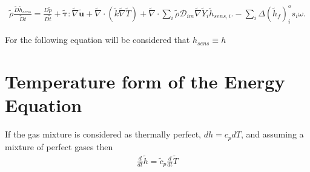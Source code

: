 \documentclass[preprint,12pt,authoryear]{elsarticle}
\begin{document}
\begin{equation}
\begin{split}
	\tilde{\rho}
	\frac{\tilde{D}\tilde{h}_{sens}}{\tilde{D}t}
=
        \frac{D \tilde{p}}{D\tilde{t}}
+       
        \pmb{\tilde{\tau}}:\tilde{\nabla} \tilde{\mathbf{u}} 
+ 
        \tilde{\nabla} \cdot (\tilde{k}\tilde{\nabla} \tilde{T})
+
        \tilde{\nabla} \cdot
        \sum\limits_i 
        \tilde{\rho}\mathcal{D}_{im}\tilde{\nabla}\tilde{Y}_i     
	\tilde{h}_{sens,i}.
-
	\sum_i\Delta(\tilde{h}_f)_i^o
	s_i \omega.
\end{split}
\end{equation}


For the following equation will be 
considered that $h_{sens}\equiv h$




\section{Temperature form  of the Energy Equation}

%
If the gas mixture is considered as thermally perfect, 
$dh=c_{p}dT$, and assuming a mixture of perfect gases then 
\begin{equation}
\begin{split}
        \frac{d}{dt}\tilde{h}=\tilde{c}_p\frac{d}{dt}\tilde{T}
\end{split}
\end{equation}
\end{document}
